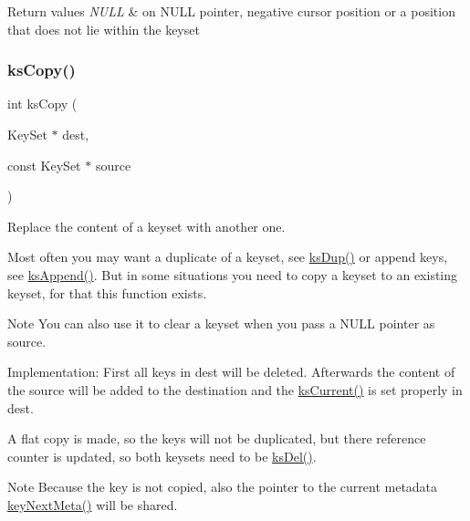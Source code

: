 \begin{DoxyRetVals}{Return values}
{\em N\+U\+LL} & on N\+U\+LL pointer, negative cursor position or a position that does not lie within the keyset \\
\hline
\end{DoxyRetVals}
\mbox{\label{group__keyset_gaba1f1dbea191f4d7e7eb3e4296ae7d5e}} 
\subsubsection{\texorpdfstring{ks\+Copy()}{ksCopy()}}
{\footnotesize\ttfamily int ks\+Copy (\begin{DoxyParamCaption}\item[{Key\+Set $\ast$}]{dest,  }\item[{const Key\+Set $\ast$}]{source }\end{DoxyParamCaption})}



Replace the content of a keyset with another one. 

Most often you may want a duplicate of a keyset, see \hyperlink{group__keyset_gac59e4b328245463f1451f68d5106151c}{ks\+Dup()} or append keys, see \hyperlink{group__keyset_ga21eb9c3a14a604ee3a8bdc779232e7b7}{ks\+Append()}. But in some situations you need to copy a keyset to an existing keyset, for that this function exists.

\begin{DoxyNote}{Note}
You can also use it to clear a keyset when you pass a N\+U\+LL pointer as {\ttfamily source}.
\end{DoxyNote}
\begin{DoxyParagraph}{Implementation\+:}
First all keys in {\ttfamily dest} will be deleted. Afterwards the content of the source will be added to the destination and the \hyperlink{group__keyset_ga4287b9416912c5f2ab9c195cb74fb094}{ks\+Current()} is set properly in {\ttfamily dest}.
\end{DoxyParagraph}
A flat copy is made, so the keys will not be duplicated, but there reference counter is updated, so both keysets need to be \hyperlink{group__keyset_ga27e5c16473b02a422238c8d970db7ac8}{ks\+Del()}.

\begin{DoxyNote}{Note}
Because the key is not copied, also the pointer to the current metadata \hyperlink{group__keymeta_ga4c88342f580a4291455a801af71ce048}{key\+Next\+Meta()} will be shared.
\end{DoxyNote}

